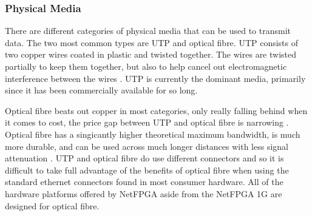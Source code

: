 \documentclass[12pt, a4paper, twoside, onecolumn]{article}
\begin{document}
\subsubsection{Physical Media}
There are different categories of physical media that can be used to transmit data. The two most common types are UTP and optical fibre. UTP consists of two copper wires coated in plastic and twisted together. The wires are twisted partially to keep them together, but also to help cancel out electromagnetic interference between the wires \cite{networks03}. UTP is currently the dominant media, primarily since it has been commercially available for so long.

Optical fibre beats out copper in most categories, only really falling behind when it comes to cost, the price gap between UTP and optical fibre is narrowing \cite{copper_fibre_universal}. Optical fibre has a singicantly higher theoretical maximum bandwidth, is much more durable, and can be used across much longer distances with less signal attenuation \cite{copper_fibre_multicom}. UTP and optical fibre do use different connectors and so it is difficult to take full advantage of the benefits of optical fibre when using the standard ethernet connectors found in most consumer hardware. All of the hardware platforms offered by NetFPGA aside from the NetFPGA 1G \cite{NetFPGA_1G} are designed for optical fibre. %

\end{document}
